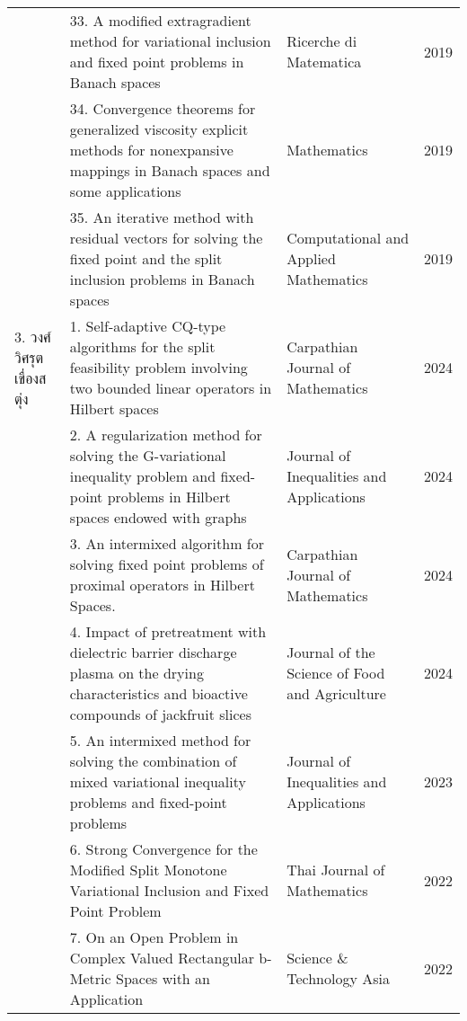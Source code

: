 {\begin{center}
\begin{longtable}{|p{}|p{}|p{}|p{}|}
&33. A modified extragradient
method for variational
inclusion and fixed point 
problems in Banach 
spaces
&Ricerche di
Matematica
&2019\\ \cline{2-4}	

&34. Convergence theorems for
generalized viscosity explicit
methods for nonexpansive
mappings in Banach spaces 
and some applications	
&Mathematics
&2019
\\ \cline{2-4}

&35. An iterative method with
residual vectors for solving
the fixed point and the split
inclusion problems in Banach
spaces
&Computational and 
Applied Mathematics
&2019\\ \hline

3. วงศ์วิศรุต เขื่องสตุ่ง&
1. Self-adaptive CQ-type 
algorithms for the split 
feasibility problem 
involving two bounded
linear operators in
Hilbert spaces
&Carpathian 
Journal of 
Mathematics &
2024 \\ \cline{2-4}

&2. A regularization method
for solving the G-variational
inequality problem and 
fixed-point problems in 
Hilbert spaces endowed with
graphs
&Journal of 
Inequalities and 
Applications
&2024 
\\ \cline{2-4}


&3. An intermixed algorithm 
for solving fixed point 
problems of proximal
operators in Hilbert Spaces.
&Carpathian Journal 
of Mathematics
&2024 \\ \cline{2-4}		


&4. Impact of pretreatment 
with dielectric barrier
discharge plasma on the
drying characteristics and 
bioactive compounds of 
jackfruit slices
&Journal of the Science 
of Food and Agriculture
&2024 \\ \cline{2-4}
			
&5. An intermixed
method for solving
the combination 
of mixed variational 
inequality problems
and fixed-point
problems
&Journal of 
Inequalities and
Applications
& 2023 
\\ \cline{2-4}		

&6.	Strong Convergence 
for the Modified 
Split Monotone 
Variational Inclusion
and Fixed Point	Problem
&Thai Journal 
of Mathematics&
2022 
\\ \cline{2-4}	

&7.	On an Open
Problem in Complex 
Valued Rectangular 
b-Metric Spaces 
with an Application
&Science \& Technology Asia
&2022 \\ \cline{2-4}


\end{longtable}
\end{center}}
